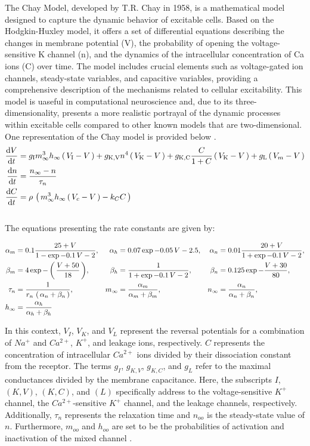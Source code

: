 \documentclass[class={myRUCProject}, crop=false]{standalone}
\begin{document}
The Chay Model, developed by T.R. Chay in 1958, is a mathematical model designed to capture the dynamic behavior of excitable cells. Based on the Hodgkin-Huxley model, it offers a set of differential equations describing the changes in membrane potential (V), the probability of opening the voltage-sensitive \gls{K} channel (n), and the dynamics of the intracellular concentration of \gls{Ca} ions (C) over time. The model includes crucial elements such as voltage-gated ion channels, steady-state variables, and capacitive variables, providing a comprehensive description of the mechanisms related to cellular excitability. This model is uaseful in computational neuroscience and, due to its three-dimensionality, presents a more realistic portrayal of the dynamic processes within excitable cells compared to other known models that are two-dimensional. One representation of the Chay model is provided below \cite{Chay1985}. \\
\begin{align}
    \frac{\mathrm{d}\displaystyle V}{\mathrm{d}\displaystyle t} &= g_\mathrm{I}  m^3_\infty h_\infty \left(\,V_\mathrm{I} - V\,\right) + g_\mathrm{K, V} n^4 \left(\,V_\mathrm{K} - V\,\right) + g_\mathrm{K, C}  \frac{C}{1+C}\left(\,V_\mathrm{K} - V\,\right) + g_\mathrm{L} \left(\,V_m - V\,\right) \\
    \frac{\mathrm{d}\displaystyle n}{\mathrm{d}\displaystyle t} &= \frac{n_\infty - n}{\tau_n} \\
    \frac{\mathrm{d}\displaystyle C}{\mathrm{d}\displaystyle t} &= \rho \, \left(\,m^3_\infty h_\infty \left(\,V_c - V\,\right) - k_C C\,\right)
\end{align}\\

The equations presenting the rate constants are given by:

\begin{align*}
    \alpha_m &= 0.1 \frac{25 + V}{1 - \exp{-0.1 \, V - 2}}, &
    \alpha_h &=  0.07 \exp{-0.05\,V -2.5}, &
    \alpha_n &= 0.01 \frac{20 + V}{1 + \exp{-0.1 \, V - 2}}, \\
    \beta_m  &= 4 \exp{-\ensuremath{\left(\,\frac{ V + 50 }{ 18 } \,\right)} }, &
    \beta_h  &= \frac{ 1 }{ 1 + \exp{-0.1 \, V - 2}}, &
    \beta_n  &= 0.125 \exp{- \frac{V + 30}{80}}, \\
    \tau_n &= \frac{1}{ r_n \, \left(\,\alpha_n + \beta_n\,\right) }, &
    m_\infty &= \frac{ \alpha_m }{ \alpha_m + \beta_m }, &
    n_\infty &= \frac{ \alpha_n }{ \alpha_n + \beta_n }, \\ 
    h_\infty &= \frac{ \alpha_h }{ \alpha_h + \beta_h }
\end{align*} 

In this context, $V_I$, $V_K$, and $V_L$ represent the reversal potentials for a combination of $Na^+$ and $Ca^{2+}$, $K^+$, and leakage ions, respectively. $C$ represents the concentration of intracellular $Ca^{2+}$ ions divided by their dissociation constant from the receptor. The terms $g_I$, $g_{K,V}$, $g_{K,C}$, and $g_L$ refer to the maximal conductances divided by the membrane capacitance. Here, the subscripts $I$, $(K,V)$, $(K,C)$, and $(L)$ specifically address to the voltage-sensitive $K^+$ channel, the $Ca^{2+}$-sensitive $K^+$ channel, and the leakage channels, respectively. Additionally, $\tau_n$ represents the relaxation time and $n_{oo}$ is the steady-state value of $n$. Furthermore, $m_{oo}$ and $h_{oo}$ are set to  be the probabilities of activation and inactivation of the mixed channel \cite{Chay1985}.
\end{document}
